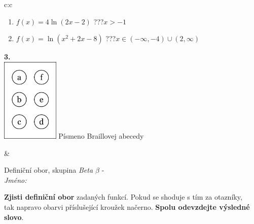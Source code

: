 \documentclass[10pt]{report}
\begin{document}
\begin{tabular}{c:c}
\begin{minipage}[c][104.5mm][t]{0.5\linewidth}
\begin{center}
\begin{minipage}{0.79\linewidth}
\begin{center}
\begin{varwidth}{\linewidth}
\begin{enumerate}
\item $f(x)=4\ln{(2x-2)}$\quad \dotfill\; ???\;\dotfill \quad $x>-1$
\item $f(x)=\ln{(x^2+2x-8)}$\quad \dotfill\; ???\;\dotfill \quad $x\in(-\infty , -4)\cup(2 , \infty)$
\end{enumerate}
\end{varwidth}
\end{center}
\end{minipage}
\begin{minipage}{0.20\linewidth}
\begin{center}
{\Huge\bfseries 3.} \\[2mm]
\includegraphics[height=40mm]{../images/braille.png}
{\small Písmeno Braillovej abecedy}
\end{center}
\end{minipage}
\end{center}
\end{minipage}
&
\begin{minipage}[c][104.5mm][t]{0.5\linewidth}
\begin{center}
\vspace{7mm}
{\huge Definiční obor, skupina \textit{Beta $\beta$} -}\\[5mm]
\textit{Jméno:}\phantom{xxxxxxxxxxxxxxxxxxxxxxxxxxxxxxxxxxxxxxxxxxxxxxxxxxxxxxxxxxxxxxxxx}\\[5mm]
\begin{minipage}{0.95\linewidth}
\begin{center}
\textbf{Zjisti definiční obor} zadaných funkcí. Pokud se shoduje s tím za otazníky,\\tak napravo obarvi příslušející kroužek načerno. \textbf{Spolu odevzdejte výsledné slovo}.
\end{center}
\end{minipage}
\\[1mm]
\begin{minipage}{0.79\linewidth}
\begin{center}
\begin{varwidth}{\linewidth}
\begin{enumerate}

\end{enumerate}
\end{varwidth}
\end{center}
\end{minipage}
\end{center}
\end{minipage}
\end{tabular}
\end{document}
